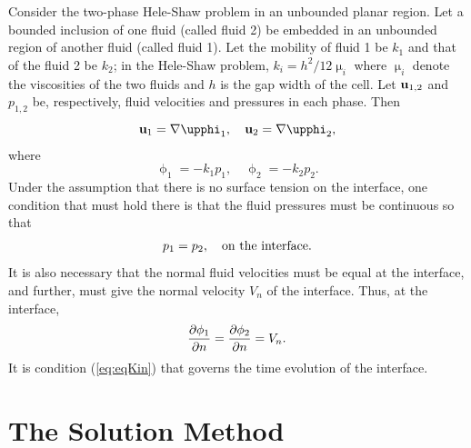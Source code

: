\documentclass{article}
\begin{document}
Consider the two-phase Hele-Shaw problem in an unbounded
planar region. Let a bounded inclusion of one fluid 
(called fluid 2) be embedded in an unbounded region of
another fluid (called fluid 1). Let the mobility of fluid 1
be $k_1$ and that of the fluid 2 be $k_2$;
in the Hele-Shaw problem, $k_i = h^2/12 \upmu_i$ where
$\upmu_i$ denote the viscosities of the two fluids and
$h$ is the gap width of the cell.
Let ${\bf u}_{1,2}$ and $p_{1,2}$ be, respectively,
fluid velocities and pressures in each phase. Then
\begin{equation}
{\bf u}_1 = \nabla \upphi_1,\quad {\bf u}_2 = \nabla \upphi_2,
\end{equation}
where
\begin{equation}
\upphi_1 = - k_1 p_1,\quad \upphi_2=-k_2 p_2.
\end{equation}
Under the assumption that there is no surface tension 
on the interface, one condition that must hold there
is that the fluid pressures must be continuous so that
\begin{equation}
p_1 = p_2,\quad {\rm on\ the \ interface}.
\end{equation}
It is also necessary 
that the normal fluid velocities must be equal at the interface,
and further, must give the normal velocity $V_n$ of the interface. Thus,
at the interface,
\begin{equation}
{\partial \phi_1 \over \partial n} ={\partial \phi_2 \over \partial n} = V_n.\label{eq:eqKin}
\end{equation}
It is condition (\ref{eq:eqKin}) that governs the
time evolution of the interface.

\section{The Solution Method}
\end{document}
